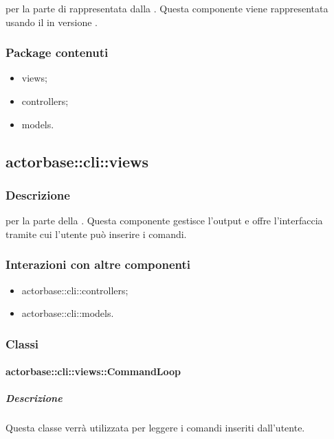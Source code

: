 \documentclass{scalatekids-article}
\begin{document}
 per la parte di  rappresentata dalla . Questa componente viene rappresentata usando il   in versione .

\subsubsection{Package contenuti}

\begin{itemize}
\item views;
\item controllers;
\item models.
\end{itemize}

\subsection{actorbase::cli::views}

\subsubsection{Descrizione}

 per la parte  della . Questa componente gestisce l'output e offre l'interfaccia tramite cui l'utente può inserire i comandi.

\subsubsection{Interazioni con altre componenti}

\begin{itemize}
\item actorbase::cli::controllers;
\item actorbase::cli::models.
\end{itemize}

\subsubsection{Classi}

\paragraph{actorbase::cli::views::CommandLoop}

\subparagraph{Descrizione}

Questa classe verrà utilizzata per leggere i comandi inseriti dall'utente.
\end{document}

